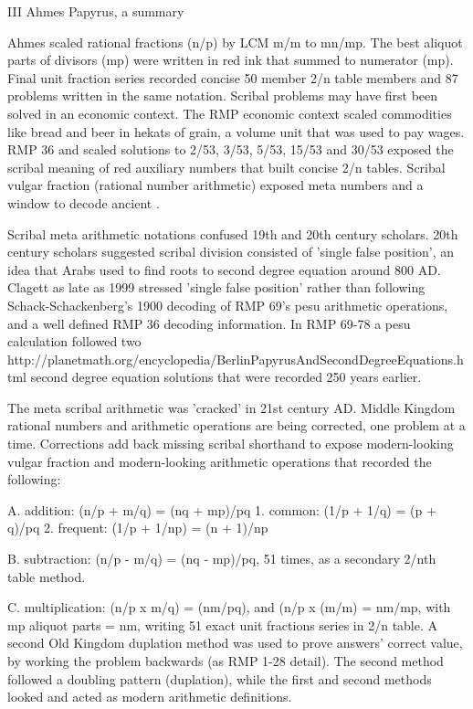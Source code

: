 \documentclass[12pt]{article}
\begin{document}
III Ahmes Papyrus, a  summary

Ahmes scaled rational fractions (n/p) by LCM m/m to mn/mp. The best aliquot parts of divisors (mp) were written in red ink that summed to numerator (mp). Final unit fraction series recorded concise 50 member 2/n table members and 87 problems written in the same notation. Scribal problems may have first been solved in an economic context. The RMP economic context scaled commodities like bread and beer in hekats of grain, a volume unit that was used to pay wages. RMP 36 and scaled solutions to 2/53, 3/53, 5/53, 15/53 and 30/53 exposed the scribal meaning of red auxiliary numbers that built concise 2/n tables. Scribal vulgar fraction (rational number arithmetic) exposed meta numbers and a window to decode ancient . 

Scribal meta arithmetic notations confused 19th and 20th century scholars. 20th century scholars suggested scribal division consisted of 'single false position', an idea that Arabs used to find roots to second degree equation around 800 AD. Clagett as late as 1999 stressed 'single false position' rather than following Schack-Schackenberg's 1900 decoding of RMP 69's pesu arithmetic operations, and a well defined RMP 36 decoding information. In RMP 69-78 a pesu calculation followed two  {http://planetmath.org/encyclopedia/BerlinPapyrusAndSecondDegreeEquations.html} second degree equation solutions that were recorded 250 years earlier. 

The meta scribal arithmetic was 'cracked' in 21st century AD. Middle Kingdom rational numbers and arithmetic operations are being corrected, one problem at a time. Corrections add back missing scribal shorthand to expose modern-looking vulgar fraction and modern-looking arithmetic operations that recorded the following:

A. addition: (n/p + m/q) = (nq + mp)/pq
  1. common: (1/p + 1/q) = (p + q)/pq
  2. frequent: (1/p + 1/np) = (n + 1)/np  

B. subtraction: (n/p - m/q) = (nq - mp)/pq, 51 times, as a secondary 2/nth table method. 

C. multiplication: (n/p x m/q) = (nm/pq), and (n/p x (m/m) = nm/mp, with mp aliquot parts = nm, writing 51 exact unit fractions series in 2/n table. A second Old Kingdom duplation method was used to prove answers' correct value, by working the problem backwards (as RMP 1-28 detail). The second method followed a doubling pattern (duplation), while the first and second methods looked and acted as modern arithmetic definitions.
\end{document}
